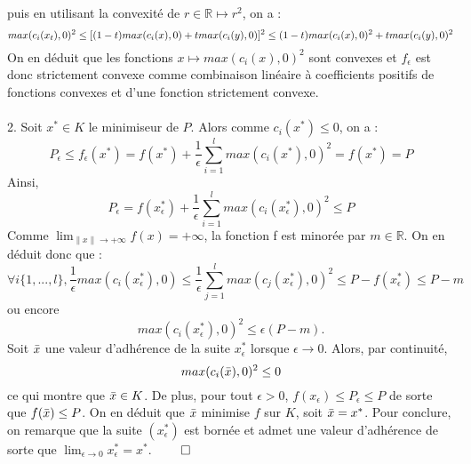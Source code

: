 \documentclass[12pt]{article}
\newcommand{\R}{\mathbb{R}}
\begin{document}
puis en utilisant la convexité de $r \in \R \mapsto r^2$, on a : \[
max(c_i(x_t),0)^2 \leq [(1-t)max(c_i(x),0) + tmax(c_i(y),0)]^2\\
\leq (1-t)max(c_i(x),0)^2 + tmax(c_i(y),0)^2
\]
On en déduit que les fonctions $x \mapsto max(c_i(x),0)^2$ sont convexes et $f_\epsilon$ est donc strictement convexe comme combinaison linéaire à coefficients positifs de fonctions convexes et d'une fonction strictement convexe.\\
\\
2. Soit $x^* \in K$ le minimiseur de $P$. Alors comme $c_i(x^*) \leq 0$, on a :
\[
P_\epsilon \leq f_\epsilon(x^*) = f(x^*) + \frac{1}{\epsilon} \sum^{l}_{i = 1}max(c_i(x^*),0)^2 = f(x^*) = P
\]
Ainsi, 
\[
P_\epsilon = f(x_\epsilon^*) + \frac{1}{\epsilon} \sum^{l}_{i = 1}max(c_i(x_\epsilon^*),0)^2
\leq P\]
Comme $\lim_{\lVert x\lVert \to +\infty} f(x) = +\infty$, la fonction f est minorée par $m \in \R$. On en déduit donc que :
\[
\forall i \{1,...,l\}, \frac{1}{\epsilon}max(c_i(x^*_\epsilon),0) \leq \frac{1}{\epsilon} \sum^{l}_{j = 1}max(c_j(x_\epsilon^*),0)^2 \leq P - f(x^*_\epsilon) \leq P - m 
\]
ou encore 
\[
max(c_i(x^*_\epsilon),0)^2 \leq \epsilon(P-m).
\]
Soit $\Bar{x}$ une valeur d'adhérence de la suite $x^*_\epsilon$ lorsque $\epsilon \to 0$. Alors, par continuité,
\[
max(c_i(\Bar{x}),0)^2 \leq 0
\]
ce qui montre que $\Bar{x} \in K$. De plus, pour tout $\epsilon > 0$, $f(x_\epsilon) \leq P_\epsilon \leq P$ de sorte que $f(\Bar{x}) \leq P$. On en déduit que $\Bar{x}$ minimise $f$ sur $K$, soit $\Bar{x} = x^*$. Pour conclure, on remarque que la suite $(x^*_\epsilon)$ est bornée et admet une valeur d'adhérence de sorte que $\lim_{\epsilon \to 0} x^*_\epsilon = x^*$. $\qed$
\end{document}
